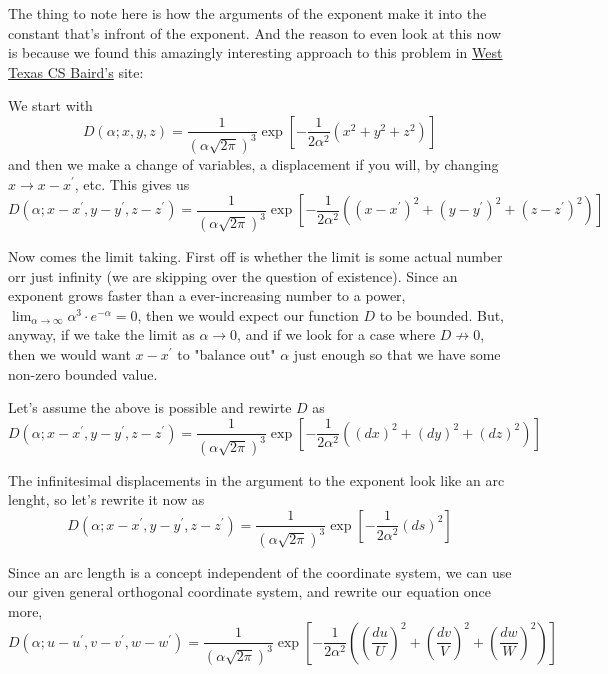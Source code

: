 The thing to note here is how the arguments of the exponent make it into the constant that's infront of the exponent.
And the reason to even look at this now is because we found this amazingly interesting approach to this problem in
\href{https://www.wtamu.edu/~cbaird/courses.html}{West Texas CS Baird's} site:

We start with
$$
D\left(\alpha ; x, y, z \right) =
    \frac{1}{\left(\alpha \sqrt{2\pi}\right)^3}
    \exp{ \left[ -\frac{1}{2\alpha^2} \left( x^2 + y^2 + z^2 \right) \right] }
$$
and then we make a change of variables, a displacement if you will, by changing $x \rightarrow x - x^\prime$, etc.
This gives us
$$
D\left(\alpha ; x-x^\prime, y-y^\prime, z-z^\prime \right) =
    \frac{1}{\left(\alpha \sqrt{2\pi}\right)^3}
    \exp{ \left[ -\frac{1}{2\alpha^2} \left( (x-x^\prime)^2 + (y-y^\prime)^2 + (z-z^\prime)^2 \right) \right] }
$$

Now comes the limit taking.
First off is whether the limit is some actual number orr just infinity (we are skipping over the question of existence).
Since an exponent grows faster than a ever-increasing number to a power,
$\lim_{\alpha\rightarrow \infty} \alpha^3 \cdot e^{-\alpha} = 0$,
then we would expect our function $D$ to be bounded.
But, anyway, if we take the limit as $\alpha\rightarrow 0$, and if we look for a case where $D\not\rightarrow 0$,
then we would want $x-x^\prime$ to "balance out" $\alpha$ just enough so that we have some non-zero bounded value.

Let's assume the above is possible and rewirte $D$ as
$$
D\left(\alpha ; x-x^\prime, y-y^\prime, z-z^\prime \right) =
    \frac{1}{\left(\alpha \sqrt{2\pi}\right)^3}
    \exp{ \left[ -\frac{1}{2\alpha^2} \left( (dx)^2 + (dy)^2 + (dz)^2 \right) \right] }
$$

The infinitesimal displacements in the argument to the exponent look like an arc lenght, so let's rewrite it now as
$$
D\left(\alpha ; x-x^\prime, y-y^\prime, z-z^\prime \right) =
    \frac{1}{\left(\alpha \sqrt{2\pi}\right)^3}
    \exp{ \left[ -\frac{1}{2\alpha^2} \left( ds \right)^2 \right] }
$$

Since an arc length is a concept independent of the coordinate system, we can use our given general orthogonal coordinate system,
and rewrite our equation once more,
$$
D\left(\alpha ; u-u^\prime, v-v^\prime, w-w^\prime \right) =
    \frac{1}{\left(\alpha \sqrt{2\pi}\right)^3}
    \exp{ \left[ -\frac{1}{2\alpha^2} \left( 
        \left(\frac{du}{U}\right)^2 + \left(\frac{dv}{V}\right)^2 + \left(\frac{dw}{W}\right)^2 \right) 
    \right] }
$$

